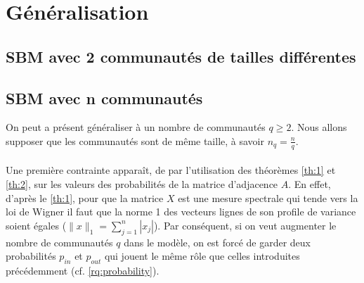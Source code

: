 \section{Généralisation}
\subsection{SBM avec 2 communautés de tailles différentes}

\subsection{SBM avec n communautés}

On peut a présent généraliser à un nombre de communautés $q \geq 2$.
Nous allons supposer que les communautés sont de même taille, à savoir $n_q = \frac{n}{q}$.
\paragraph{}\label{rq:contrainte model}
Une première contrainte apparaît, de par l'utilisation des théorèmes \ref{th:1} et \ref{th:2}, sur les valeurs des probabilités de la matrice d'adjacence $A$.
En effet, d'après le \autoref{th:1}, pour que la matrice $X$ est une mesure spectrale qui tende vers la loi de Wigner il faut que la norme 1 des vecteurs lignes de son profile de variance soient égales ($\parallel x \parallel_1 = \sum_{j=1}^{n}|x_j|$).
Par conséquent, si on veut augmenter le nombre de communautés $q$ dans le modèle, on est forcé de garder deux probabilités $p_{in}$ et $p_{out}$ qui jouent le même rôle que celles introduites précédemment (cf. \ref{rq:probability}).\\

